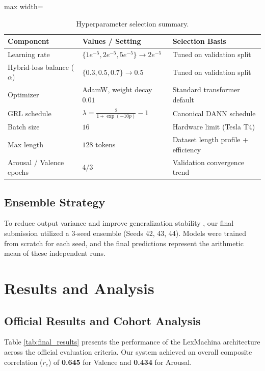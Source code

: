 \documentclass[11pt, a4paper]{article}
\begin{document}
\begin{table}[h]
\centering
\Large
\setlength{\tabcolsep}{8pt}
\renewcommand{\arraystretch}{1.2}
\begin{adjustbox}{max width=\columnwidth}
\begin{tabular}{l|l|l}
\toprule
\textbf{Component} & \textbf{Values / Setting} & \textbf{Selection Basis} \\
\midrule
Learning rate & $\{1e^{-5}, 2e^{-5}, 5e^{-5}\}\rightarrow 2e^{-5}$ & Tuned on validation split \\
Hybrid-loss balance ($\alpha$) & $\{0.3, 0.5, 0.7\}\rightarrow 0.5$ & Tuned on validation split \\
Optimizer & AdamW, weight decay $0.01$ & Standard transformer default \\
GRL schedule & $\lambda=\frac{2}{1+\exp(-10p)}-1$ & Canonical DANN schedule \\
Batch size & $16$ & Hardware limit (Tesla T4) \\
Max length & $128$ tokens & Dataset length profile + efficiency \\
Arousal / Valence epochs & $4 / 3$ & Validation convergence trend \\
\bottomrule
\end{tabular}
\end{adjustbox}
\caption{Hyperparameter selection summary.}
\label{tab:hp_summary}
\end{table}

\subsection{Ensemble Strategy}
To reduce output variance and improve generalization stability \citep{10.1007/3-540-45014-9_1}, our final submission utilized a 3-seed ensemble (Seeds 42, 43, 44). Models were trained from scratch for each seed, and the final predictions represent the arithmetic mean of these independent runs.

\section{Results and Analysis}
\label{sec:results}

\subsection{Official Results and Cohort Analysis}

Table \ref{tab:final_results} presents the performance of the LexMachina architecture across the official evaluation criteria. Our system achieved an overall composite correlation ($r_{c}$) of \textbf{0.645} for Valence and \textbf{0.434} for Arousal. 
\end{document}
